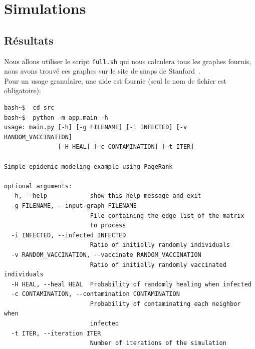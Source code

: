 \documentclass{report}
\begin{document}
\section{Simulations}
\subsection{Résultats}
Nous allons utiliser le script \texttt{full.sh} qui nous calculera tous les graphes fournis,
nous avons trouvé ces graphes sur le site de snaps de Stanford~\cite{snapnets}.\\
Pour un usage granulaire, une aide est fournie (seul le nom de fichier est obligatoire):
\begin{tcolorbox}
  \begin{verbatim}
bash~$  cd src
bash~$  python -m app.main -h
usage: main.py [-h] [-g FILENAME] [-i INFECTED] [-v RANDOM_VACCINATION]
               [-H HEAL] [-c CONTAMINATION] [-t ITER]

Simple epidemic modeling example using PageRank

optional arguments:
  -h, --help            show this help message and exit
  -g FILENAME, --input-graph FILENAME
                        File containing the edge list of the matrix
                        to process
  -i INFECTED, --infected INFECTED
                        Ratio of initially randomly individuals
  -v RANDOM_VACCINATION, --vaccinate RANDOM_VACCINATION
                        Ratio of initially randomly vaccinated individuals
  -H HEAL, --heal HEAL  Probability of randomly healing when infected
  -c CONTAMINATION, --contamination CONTAMINATION
                        Probability of contaminating each neighbor when
                        infected
  -t ITER, --iteration ITER
                        Number of iterations of the simulation
  \end{verbatim}
\end{tcolorbox}
\end{document}
